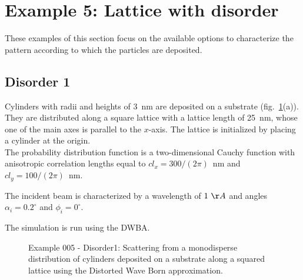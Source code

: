 \newpage
\section{Example 5: Lattice with disorder}
These examples of this section focus on the available options to characterize the pattern according to which the particles are deposited.

\subsection{Disorder 1} \label{sec:ex005Dis1}
Cylinders with radii and heights of 3~nm are deposited on a substrate (fig.~\ref{fig:PythonEx5Dis1}(a)). They are distributed along a square lattice with a lattice length of 25~nm, whose one of the main axes is parallel to the $x$-axis. The lattice is initialized by placing a cylinder at the origin.\\ The probability distribution function is a two-dimensional Cauchy function  with anisotropic correlation lengths equal to $cl_x=300/(2\pi)$~nm and $cl_y=100/(2\pi)$~nm.


The incident beam is characterized by a wavelength of $1~\AA$ and angles $\alpha_i=0.2^{\circ}$ and $\phi_i=0^{\circ}$.
 
The simulation is run using the DWBA.

\begin{figure}[H]
\hfill
{}
\hfill
{}
\hfill
\caption{Example 005 - Disorder1: Scattering from a monodisperse distribution of cylinders deposited on a substrate along a squared lattice using the Distorted Wave Born approximation.}
\label{fig:PythonEx5Dis1} 
\end{figure}

